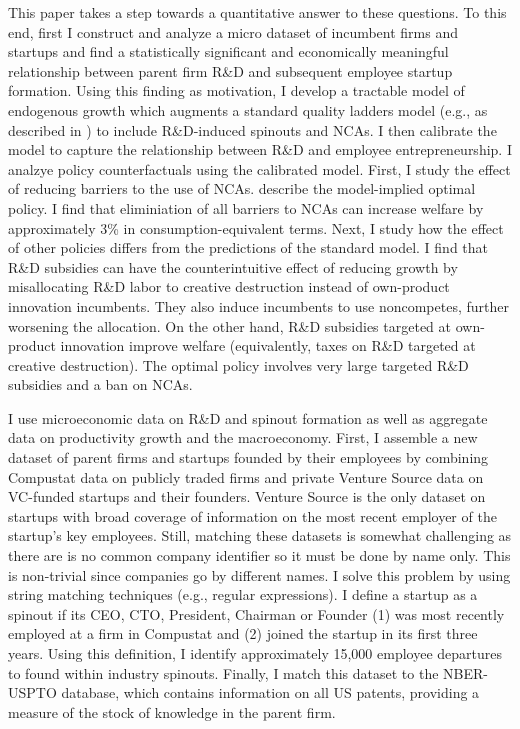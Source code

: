 \documentclass[11pt,english]{article}
\begin{document}
This paper takes a step towards a quantitative answer to these questions. To this end, first I construct and analyze a micro dataset of incumbent firms and startups and find a statistically significant and economically meaningful relationship between parent firm R\&D and subsequent employee startup formation. Using this finding as motivation, I develop a tractable model of endogenous growth which augments a standard quality ladders model (e.g., as described in \cite{acemoglu_introduction_2009}) to include R\&D-induced spinouts and NCAs. I then calibrate the model to capture the relationship between R\&D and employee entrepreneurship. I analzye policy counterfactuals using the calibrated model. First, I study the effect of reducing barriers to the use of NCAs. describe the model-implied optimal policy. I find that eliminiation of all barriers to NCAs can increase welfare by approximately 3\% in consumption-equivalent terms.  Next, I study how the effect of other policies differs from the predictions of the standard model. I find that R\&D subsidies can have the counterintuitive effect of reducing growth by misallocating R\&D labor to creative destruction instead of own-product innovation incumbents. They also induce incumbents to use noncompetes, further worsening the allocation. On the other hand, R\&D subsidies targeted at own-product innovation improve welfare (equivalently, taxes on R\&D targeted at creative destruction). The optimal policy involves very large targeted R\&D subsidies and a ban on NCAs. 

I use microeconomic data on R\&D and spinout formation as well as aggregate data on productivity growth and the macroeconomy. First, I assemble a new dataset of parent firms and startups founded by their employees by combining Compustat data on publicly traded firms and private Venture Source data on VC-funded startups and their founders. Venture Source is the only dataset on startups with broad coverage of information on the most recent employer of the startup's key employees. Still, matching these datasets is somewhat challenging as there are is no common company identifier so it must be done by name only. This is non-trivial since companies go by different names. I solve this problem by using string matching techniques (e.g., regular expressions). I define a startup as a spinout if its CEO, CTO, President, Chairman or Founder (1) was most recently employed at a firm in Compustat and (2) joined the startup in its first three years. Using this definition, I identify approximately 15,000 employee departures to found within industry spinouts. Finally, I match this dataset to the NBER-USPTO database, which contains information on all US patents, providing a measure of the stock of knowledge in the parent firm.
\end{document}
